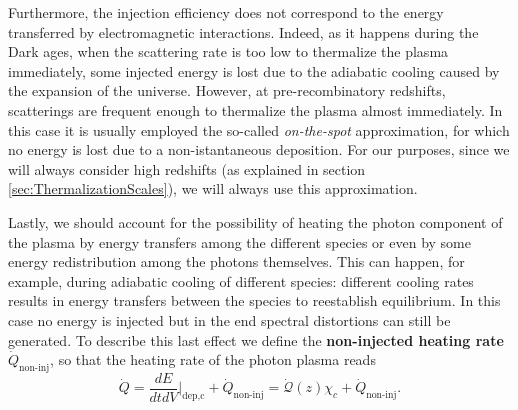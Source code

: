 Furthermore, the injection efficiency does not correspond to the energy transferred by electromagnetic interactions. Indeed, as it happens during the Dark ages, when the scattering rate is too low to thermalize the plasma immediately, some injected energy is lost due to the adiabatic cooling caused by the expansion of the universe. However, at pre-recombinatory redshifts, scatterings are frequent enough to thermalize the plasma almost immediately. In this case it is usually employed the so-called \emph{on-the-spot} approximation, for which no energy is lost due to a non-istantaneous deposition. For our purposes, since we will always consider high redshifts (as explained in section \ref{sec:ThermalizationScales}), we will always use this approximation.

Lastly, we should account for the possibility of heating the photon component of the plasma by energy transfers among the different species or even by some energy redistribution among the photons themselves. This can happen, for example, during adiabatic cooling of different species: different cooling rates results in energy transfers between the species to reestablish equilibrium.   In this case no energy is injected but in the end spectral distortions can still be generated. To describe this last effect we define the \textbf{non-injected heating rate} $\dot{Q}_\text{non-inj}$, so that the heating rate of the photon plasma reads
\begin{equation}
    \dot{Q}=\frac{dE}{dtdV}\bigg|_{\text{dep,c}}+\dot{Q}_\text{non-inj}=\dot{\mathcal{Q}}(z)\chi_c+\dot{Q}_\text{non-inj}.\label{eq:heating_rate}
\end{equation}

